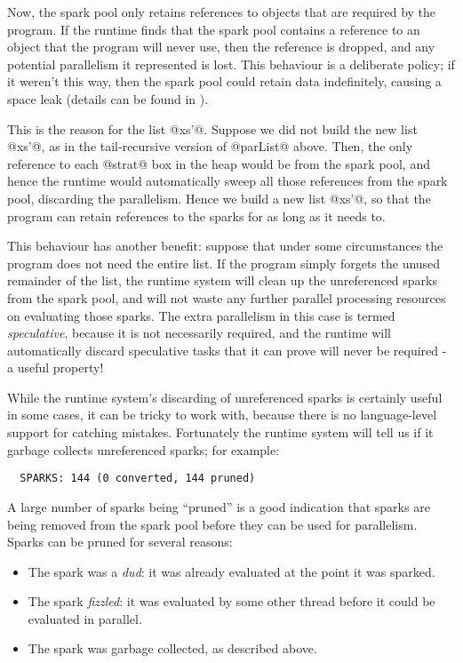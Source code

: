 Now, the spark pool only retains references to objects that are
required by the program.  If the runtime finds that the spark pool
contains a reference to an object that the program will never use,
then the reference is dropped, and any potential parallelism it
represented is lost.  This behaviour is a deliberate policy; if it
weren't this way, then the spark pool could retain data indefinitely,
causing a space leak (details can be found in \citet{seq-no-more}).

This is the reason for the list @xs'@.  Suppose we did not build the
new list @xs'@, as in the tail-recursive version of @parList@ above.
Then, the only reference to each @strat@ box in the heap would be from the
spark pool, and hence the runtime would automatically sweep all those
references from the spark pool, discarding the parallelism.  Hence we
build a new list @xs'@, so that the program can retain references to
the sparks for as long as it needs to.

This behaviour has another benefit: suppose that under some
circumstances the program does not need the entire list.  If the
program simply forgets the unused remainder of the list, the runtime
system will clean up the unreferenced sparks from the spark pool, and
will not waste any further parallel processing resources on evaluating
those sparks.  The extra parallelism in this case is termed
\emph{speculative}, because it is not necessarily required, and the
runtime will automatically discard speculative tasks that it can prove
will never be required - a useful property!

While the runtime system's discarding of unreferenced sparks is
certainly useful in some cases, it can be tricky to work with, because
there is no language-level support for catching mistakes.  Fortunately
the runtime system will tell us if it garbage collects unreferenced
sparks; for example:

{\small \begin{verbatim}
  SPARKS: 144 (0 converted, 144 pruned)
\end{verbatim}}

\noindent A large number of sparks being ``pruned'' is a good
indication that sparks are being removed from the spark pool before
they can be used for parallelism.  Sparks can be pruned for several
reasons:

\begin{itemize}
\item The spark was a \emph{dud}: it was already evaluated at the
  point it was sparked.
\item The spark \emph{fizzled}: it was evaluated by some other thread
  before it could be evaluated in parallel.
\item The spark was garbage collected, as described above.
\end{itemize}


